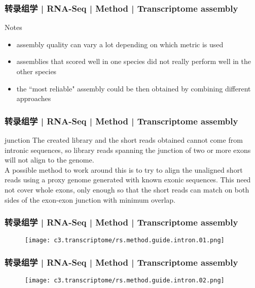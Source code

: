 \begin{frame}
  \frametitle{转录组学 | RNA-Seq | Method | Transcriptome assembly}
  \begin{block}{Notes}
    \begin{itemize}
      \item assembly quality can vary a lot depending on which metric is used
      \item assemblies that scored well in one species did not really perform well in the other species
      \item the ``most reliable" assembly could be then obtained by combining different approaches
    \end{itemize}
  \end{block}
\end{frame}

\begin{frame}
  \frametitle{转录组学 | RNA-Seq | Method | Transcriptome assembly}
  \begin{block}{junction}
 The created library and the short reads obtained cannot come from intronic sequences, so library reads spanning the junction of two or more exons will not align to the genome.\\
 \vspace{1em}
 A possible method to work around this is to try to align the unaligned short reads using a proxy genome generated with known exonic sequences. This need not cover whole exons, only enough so that the short reads can match on both sides of the exon-exon junction with minimum overlap.
  \end{block}
\end{frame}

\begin{frame}
  \frametitle{转录组学 | RNA-Seq | Method | Transcriptome assembly}
  \begin{figure}
    \centering
    \texttt{[image: c3.transcriptome/rs.method.guide.intron.01.png]}
  \end{figure}
\end{frame}

\begin{frame}
  \frametitle{转录组学 | RNA-Seq | Method | Transcriptome assembly}
  \begin{figure}
    \centering
    \texttt{[image: c3.transcriptome/rs.method.guide.intron.02.png]}
  \end{figure}
\end{frame}

